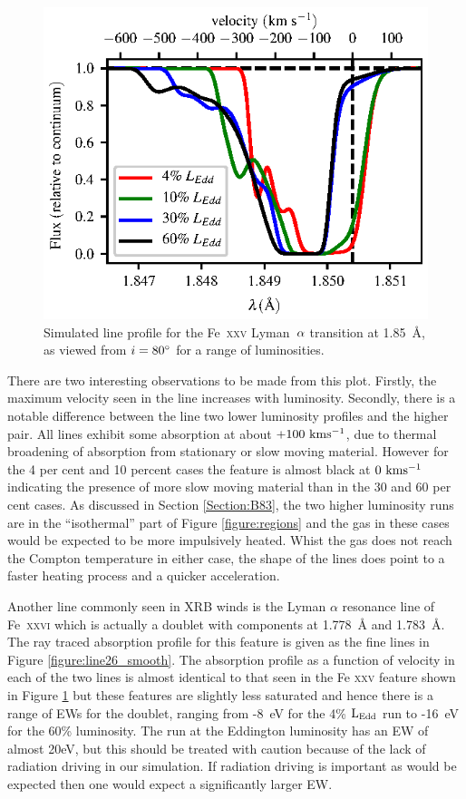 \documentclass[a4paper,fleqn,usenatbib]{mnras}
\begin{document}
\begin{figure}
\includegraphics[width=\columnwidth]{figures/80_degrees_fe25.eps}
\caption{Simulated line profile for the Fe~\textsc{xxv} Lyman~$\rm{\alpha}$
transition at 1.85~{\AA}, as viewed from $i = 80\degree$ for a range
of luminosities.}
\label{figure:line25}
\end{figure}

There are two interesting observations to be made from this plot. Firstly, the maximum velocity seen in 
the line increases with luminosity. Secondly, there is a notable difference between the line two lower luminosity 
profiles and the higher pair. All lines exhibit some absorption at about $\rm{+100~kms^{-1}}$, due to thermal 
broadening of absorption from stationary or slow moving material. However for the 4 per cent and 10 percent 
cases the feature is almost black at $\rm{0~kms^{-1}}$ indicating the presence of more slow moving material than 
in the 30 and 60 per cent cases. As discussed in Section \ref{Section:B83}, the two higher luminosity runs
are in the ``isothermal'' part of Figure \ref{figure:regions} and the gas in these cases would be expected to 
be more impulsively heated. Whist the gas does not reach the Compton temperature in either case, the 
shape of the lines does point to a faster heating process and a quicker acceleration. 


Another line commonly seen in XRB winds is the Lyman $\alpha$ resonance 
line of Fe~\textsc{xxvi} which is actually a doublet with components at
1.778~{\AA} and 1.783~{\AA}. The ray traced absorption profile for this 
feature is given as the fine lines in Figure \ref{figure:line26_smooth}. The absorption profile
as a function of velocity in each of the two lines is almost identical to that seen in the 
Fe \textsc{xxv} feature shown in Figure \ref{figure:line25} but these features
are slightly less
saturated and hence there is a range of EWs for the doublet, ranging from -8~eV for the 4\% $\rm{L_{Edd}}$
run to -16~eV for the 60\% luminosity. The run at the Eddington luminosity 
has an EW of almost 20eV, but this should be treated with caution because of the lack
of radiation driving in our simulation. If radiation driving is important as would be expected then one would expect
a significantly larger EW.
\end{document}
